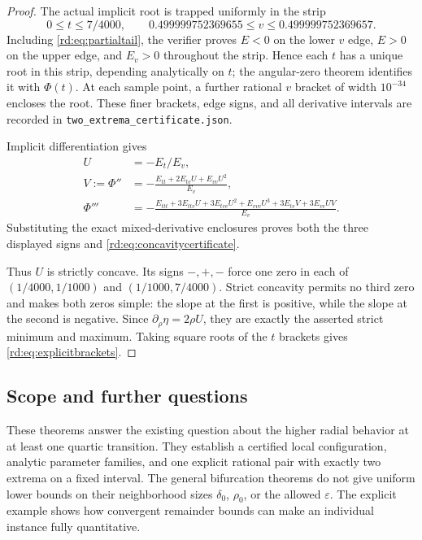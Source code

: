 \begin{proof}
The actual implicit root is trapped uniformly in the strip
\[
 0\le t\le7/4000,\qquad
 0.499999752369655\le v\le0.499999752369657.
\]
Including \eqref{rd:eq:partialtail}, the verifier proves $E<0$ on
the lower $v$ edge, $E>0$ on the upper edge, and $E_v>0$ throughout
the strip. Hence each $t$ has a unique root in this strip, depending
analytically on $t$; the angular-zero theorem identifies it with
$\Phi(t)$. At each sample point, a further rational $v$ bracket of
width $10^{-34}$ encloses the root. These finer brackets, edge signs,
and all derivative intervals are recorded in
\texttt{two\_extrema\_certificate.json}.

Implicit differentiation gives
\begin{align*}
 U&=-E_t/E_v,\\
 V:=\Phi''&=-\frac{E_{tt}+2E_{tv}U+E_{vv}U^2}{E_v},\\
 \Phi'''&=-\frac{E_{ttt}+3E_{ttv}U+3E_{tvv}U^2+E_{vvv}U^3
                       +3E_{tv}V+3E_{vv}UV}{E_v}.
\end{align*}
Substituting the exact mixed-derivative enclosures proves both the
three displayed signs and \eqref{rd:eq:concavitycertificate}.

Thus $U$ is strictly concave. Its signs $-,+,-$ force one zero in
each of $(1/4000,1/1000)$ and $(1/1000,7/4000)$. Strict concavity
permits no third zero and makes both zeros simple: the slope at the
first is positive, while the slope at the second is negative. Since
$\partial_\rho\eta=2\rho U$, they are exactly the asserted strict
minimum and maximum. Taking square roots of the $t$ brackets gives
\eqref{rd:eq:explicitbrackets}.
\end{proof}

\subsection{Scope and further questions}

These theorems answer the existing question about the higher radial
behavior at at least one quartic transition. They establish a certified
local configuration, analytic parameter families, and one explicit
rational pair with exactly two extrema on a fixed interval. The general
bifurcation theorems do not give uniform lower bounds on their
neighborhood sizes $\delta_0$, $\rho_0$, or the allowed
$\varepsilon$. The explicit example shows how convergent remainder
bounds can make an individual instance fully quantitative.

